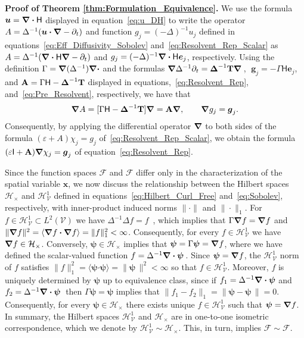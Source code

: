 \documentclass[leqno,onefignum,onetabnum]{siamltex1213}
\newcommand{\Tb}{\mathbf{T}}
\newcommand{\Ab}{\mathbf{A}}
\newcommand{\Vc}{\mathcal{V}}
\newcommand{\Hc}{\mathcal{H}}
\newcommand{\Fc}{\mathcal{F}}
\newcommand{\Hm}{\mathsf{H}}
\newcommand{\Ib}{\mathsf{I}}
\newcommand{\Hs}{\mathscr{H}}
\newcommand{\Fs}{\mathscr{F}}
\newcommand\bDelta{\mbox{\boldmath${\Delta}$}}
\newcommand\bnabla{\mbox{\boldmath${\nabla}$}}
\providecommand\bcdot{\boldsymbol{\cdot}}
\newcommand{\vecg}{\boldsymbol{g}}
\newcommand{\vecx}{\boldsymbol{x}}
\newcommand{\vecu}{\boldsymbol{u}}
\newcommand{\vece}{\boldsymbol{e}}
\newcommand{\vecpsi}{\boldsymbol{\psi}}
\begin{document}
\textbf{Proof of Theorem \ref{thm:Formulation_Equivalence}.}\hspace{1ex}
%
We use the formula $\vecu =\bnabla \bcdot\Hm$ displayed in
equation~\eqref{eq:u_DH} to write the operator $A=\Delta^{-1}(\vecu
\bcdot\bnabla -\partial_t)$ 
and function $g_j=(-\Delta)^{-1}u_j$ defined in
equations~\eqref{eq:Eff_Diffusivity_Sobolev}
and~\eqref{eq:Resolvent_Rep_Scalar} 
as $A=\Delta^{-1}(\bnabla \bcdot\Hm\bnabla -\partial_t)$ and
$g_j=(-\Delta)^{-1}\bnabla \bcdot\Hm\vece _j$, respectively. Using the definition
$\Gamma=\bnabla (\Delta^{-1})\bnabla \bcdot$ and the formulas
$\bnabla \Delta^{-1}\partial_t=\bDelta^{-1}\Tb\bnabla \,$,
$\;\vecg_j=-\Gamma\Hm\vece _j$, and $\Ab=\Gamma\Hm-\bDelta^{-1}\Tb$
displayed in equations,~\eqref{eq:Resolvent_Rep},
and~\eqref{eq:Pre_Resolvent}, respectively, we have that    
%
\begin{align}\label{eq:A_Ab_Relation}
  \bnabla A=[\Gamma\Hm-\bDelta^{-1}\Tb]\bnabla =\Ab\bnabla , \qquad
  \bnabla g_j=\vecg_j.
\end{align}
%
Consequently, by applying the
differential operator $\bnabla $ to both sides of the formula
$(\varepsilon+A)\chi_j=g_j$ of~\eqref{eq:Resolvent_Rep_Scalar}, we obtain the
formula  $(\varepsilon\Ib+\Ab)\bnabla \chi_j=\vecg_j$ of
equation~\eqref{eq:Resolvent_Rep}. 



Since the function spaces $\Fs$ and $\Fc$ differ
only in the characterization of the spatial variable $\vecx$, we now
discuss the relationship between the Hilbert spaces $\Hc_\times$ and
$\Hs^1_{\Vc}$ defined in equations~\eqref{eq:Hilbert_Curl_Free}
and~\eqref{eq:Sobolev}, respectively, with inner-product induced norms 
$\|\cdot\|$ and $\|\cdot\|_1$. For $f\in\Hs^1_{\Vc}\subset L^2(\Vc)$ we have 
$\Delta^{-1}\Delta f=f$~\cite{Stakgold:BVP:2000}, which implies that
$\Gamma\bnabla f=\bnabla f$ and
$\|\bnabla f\|^2=\langle\bnabla f\bcdot\bnabla f\rangle=\|f\|_1^2<\infty$. Consequently, for every  
$f\in\Hs^1_{\Vc}$ we have $\bnabla f\in\Hc_\times$. Conversely,
$\vecpsi\in\Hc_\times$ implies that $\vecpsi=\Gamma\vecpsi=\bnabla f$, where
we have defined the scalar-valued function
$f=\Delta^{-1}\bnabla \bcdot\vecpsi\,$. Since $\vecpsi=\bnabla f$, the
$\Hs^1_{\Vc}$ norm of $f$ satisfies
$\|f\|_1^2=\langle\vecpsi\bcdot\vecpsi\rangle=\|\vecpsi\,\|^2<\infty$ so that
$f\in\Hs^1_{\Vc}$. Moreover, $f$ is uniquely determined by $\vecpsi$ up
to equivalence class, since if $f_1=\Delta^{-1}\bnabla \bcdot\vecpsi$ and
$f_2=\Delta^{-1}\bnabla \bcdot\vecpsi\,$ then $\Gamma\vecpsi=\vecpsi$ implies
that $\|f_1-f_2\|_1=\|\vecpsi-\vecpsi\,\|=0$. Consequently, for every  
$\vecpsi\in\Hc_\times$ there exists unique $f\in\Hs^1_{\Vc}$ such that
$\vecpsi=\bnabla f$.  In summary, the Hilbert spaces $\Hs^1_{\Vc}$ and
$\Hc_\times$ are in one-to-one isometric correspondence, which we denote by
$\Hs^1_{\Vc}\sim\Hc_\times$. This, in turn, implies  $\Fs\sim\Fc$.  
\end{document}

